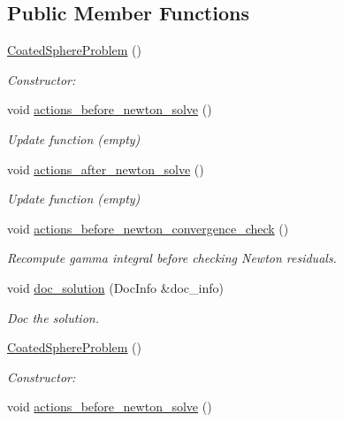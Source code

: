 \subsection*{Public Member Functions}
\begin{DoxyCompactItemize}
\item 
\hyperlink{classCoatedSphereProblem_ab9c983e7f0bed66f13d59bd65d6d151b}{Coated\+Sphere\+Problem} ()
\begin{DoxyCompactList}\small\item\em Constructor\+: \end{DoxyCompactList}\item 
void \hyperlink{classCoatedSphereProblem_aa268009485d4d2bb6b4856bfa318aaa9}{actions\+\_\+before\+\_\+newton\+\_\+solve} ()
\begin{DoxyCompactList}\small\item\em Update function (empty) \end{DoxyCompactList}\item 
void \hyperlink{classCoatedSphereProblem_ae5287efab54b16ec1bd5cced98971c9c}{actions\+\_\+after\+\_\+newton\+\_\+solve} ()
\begin{DoxyCompactList}\small\item\em Update function (empty) \end{DoxyCompactList}\item 
void \hyperlink{classCoatedSphereProblem_a2f55bc904971ca96eb9af3451ef5b4c4}{actions\+\_\+before\+\_\+newton\+\_\+convergence\+\_\+check} ()
\begin{DoxyCompactList}\small\item\em Recompute gamma integral before checking Newton residuals. \end{DoxyCompactList}\item 
void \hyperlink{classCoatedSphereProblem_aaeade2a110160c002b2b45954a5a0edc}{doc\+\_\+solution} (Doc\+Info \&doc\+\_\+info)
\begin{DoxyCompactList}\small\item\em Doc the solution. \end{DoxyCompactList}\item 
\hyperlink{classCoatedSphereProblem_ab9c983e7f0bed66f13d59bd65d6d151b}{Coated\+Sphere\+Problem} ()
\begin{DoxyCompactList}\small\item\em Constructor\+: \end{DoxyCompactList}\item 
void \hyperlink{classCoatedSphereProblem_aa268009485d4d2bb6b4856bfa318aaa9}{actions\+\_\+before\+\_\+newton\+\_\+solve} ()

\end{DoxyCompactItemize}
